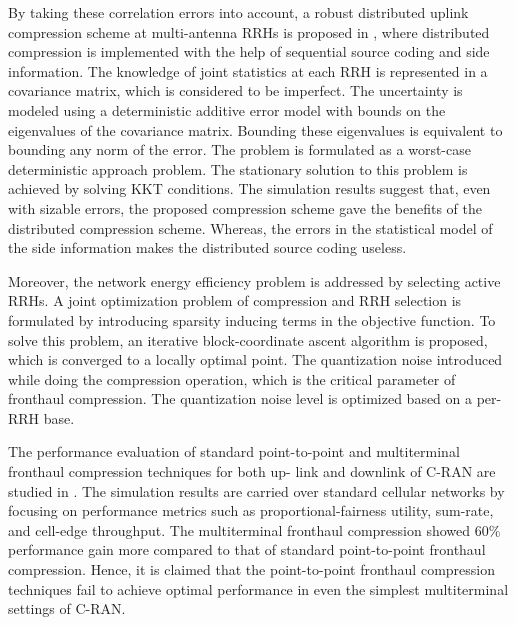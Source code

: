 \begin{multicols}{2}
\begin{itemize}
By taking these correlation errors into account, a robust distributed uplink compression scheme at multi-antenna RRHs is proposed in \cite{art3-key51}, where distributed compression is implemented with the help of sequential source coding and side information. The knowledge of joint statistics at each RRH is represented in a covariance matrix, which is considered to be imperfect. The uncertainty is modeled using a deterministic additive error model with bounds on the eigenvalues of the covariance matrix. Bounding these eigenvalues is equivalent to bounding any norm of the error. The problem is formulated as a worst-case deterministic approach problem. The stationary solution to this problem is achieved by solving KKT conditions. The simulation results suggest that, even with sizable errors, the proposed compression scheme gave the benefits of  the distributed compression scheme. Whereas, the errors in the
statistical model of the side information makes the distributed source coding useless.

Moreover, the network energy efficiency problem is addressed by selecting active RRHs. A joint optimization problem of compression and RRH selection is formulated by introducing sparsity inducing terms in the objective function. To solve this problem, an iterative block-coordinate ascent algorithm is proposed, which is converged to a locally optimal point. The quantization noise introduced while doing the compression operation, which is the critical parameter of fronthaul compression. The quantization noise level is optimized based on a per-RRH base.

The performance evaluation of standard point-to-point and multiterminal fronthaul compression techniques for both up- link and downlink of C-RAN are studied in \cite{art3-key52}. The simulation results are carried over standard cellular networks by focusing on performance metrics such as proportional-fairness utility, sum-rate, and cell-edge throughput. The multiterminal fronthaul compression showed 60\% performance gain more compared to that of standard point-to-point fronthaul compression. Hence, it is claimed that the point-to-point fronthaul compression techniques fail to achieve optimal performance in even the simplest multiterminal settings of C-RAN.


\end{itemize}
\end{multicols}
